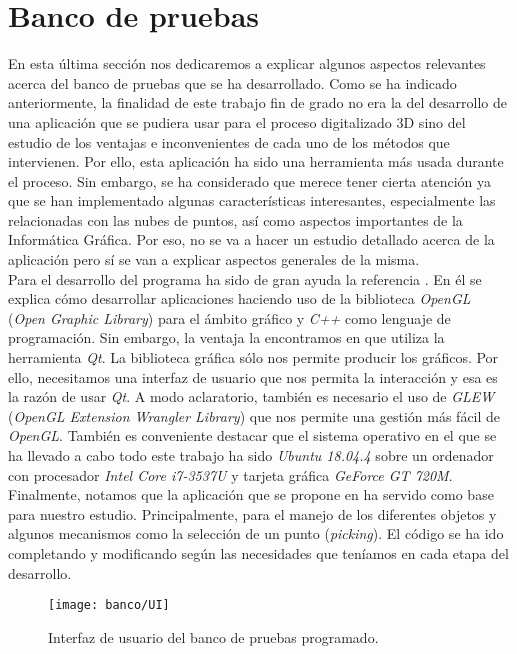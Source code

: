 \chapter{Banco de pruebas}

En esta última sección nos dedicaremos a explicar algunos aspectos relevantes acerca del banco de pruebas que se ha desarrollado. Como se ha indicado anteriormente, la finalidad de este trabajo fin de grado no era la del desarrollo de una aplicación que se pudiera usar para el proceso digitalizado 3D sino del estudio de los ventajas e inconvenientes de cada uno de los métodos que intervienen. Por ello, esta aplicación ha sido una herramienta más usada durante el proceso. Sin embargo, se ha considerado que merece tener cierta atención ya que se han implementado algunas características interesantes, especialmente las relacionadas con las nubes de puntos, así como aspectos importantes de la Informática Gráfica. Por eso, no se va a hacer un estudio detallado acerca de la aplicación pero sí se van a explicar aspectos generales de la misma. \\

Para el desarrollo del programa ha sido de gran ayuda la referencia \cite{QT+Opengl}. En él se explica cómo desarrollar aplicaciones haciendo uso de la biblioteca \textit{OpenGL} (\textit{Open Graphic Library}) para el ámbito gráfico y \textit{C++} como lenguaje de programación. Sin embargo, la ventaja la encontramos en que utiliza la herramienta \textit{Qt}. La biblioteca gráfica sólo nos permite producir los gráficos. Por ello, necesitamos una interfaz de usuario que nos permita la interacción y esa es la razón de usar \textit{Qt}. A modo aclaratorio, también es necesario el uso de \textit{GLEW} (\textit{OpenGL Extension Wrangler Library}) que nos permite una gestión más fácil de \textit{OpenGL}. También es conveniente destacar que el sistema operativo en el que se ha llevado a cabo todo este trabajo ha sido \textit{Ubuntu 18.04.4} sobre un ordenador con procesador \textit{Intel Core i7-3537U} y tarjeta gráfica \textit{GeForce GT 720M}.\\

Finalmente, notamos que la aplicación que se propone en \cite{QT+Opengl} ha servido como base para nuestro estudio. Principalmente, para el manejo de los diferentes objetos y algunos mecanismos como la selección de un punto (\textit{picking}). El código se ha ido completando y modificando según las necesidades que teníamos en cada etapa del desarrollo.

\begin{figure}
	\centering
	\texttt{[image: banco/UI]}
	\caption{Interfaz de usuario del banco de pruebas programado.}
	\label{fig:ui}
\end{figure}


